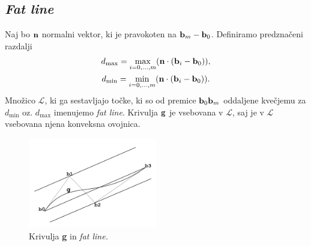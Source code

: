 
\subsection{{\em Fat line}}
Naj bo ${\bf n}$ normalni vektor, ki je pravokoten na ${\bf b}_m - {\bf b}_0$. Definiramo predznačeni razdalji 
\begin{gather*}
d_{\text{max}} = \max _{i=0,\ldots ,m} ({\bf n}\cdot ({\bf b}_i - {\bf b}_0)),\\
d_{\text{min}} = \min _{i=0,\ldots ,m} ({\bf n}\cdot ({\bf b}_i - {\bf b}_0)).
\end{gather*}
Množico $\mathcal{L}$, ki ga sestavljajo točke, ki so od premice ${\bf b}_0{\bf b}_m$ oddaljene kvečjemu za $d_{\text{min}}$ oz. $d_{\text{max}}$ imenujemo {\em fat line}. Krivulja ${\bf g}$ je vsebovana v $\mathcal{L}$, saj je v $\mathcal{L}$ vsebovana njena konveksna ovojnica.
\begin{figure}[!h]
    \centering 
    \includegraphics[width=0.5\textwidth]{fat_line}
    \caption{Krivulja {\bf g} in {\em fat line.}}
  	\label{slika3}
\end{figure}